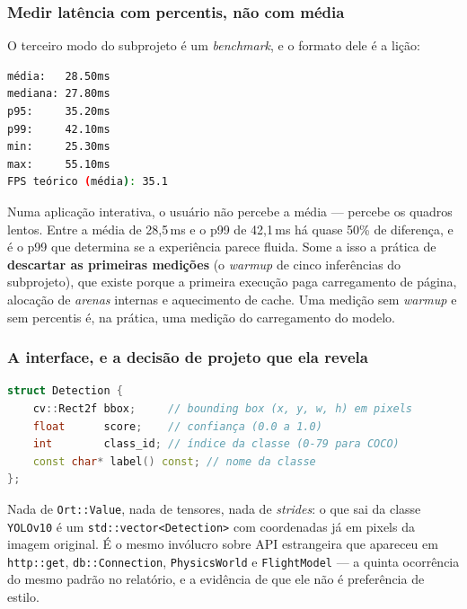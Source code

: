 \subsubsection{Medir latência com percentis, não com média}

O terceiro modo do subprojeto é um \emph{benchmark}, e o formato dele é a lição:

\begin{lstlisting}[style=bt, language=bash,
    caption={Saída de \texttt{src/yolo/}: \emph{benchmark} do \texttt{yolov10n} em CPU.}]
média:   28.50ms
mediana: 27.80ms
p95:     35.20ms
p99:     42.10ms
min:     25.30ms
max:     55.10ms
FPS teórico (média): 35.1
\end{lstlisting}

\begin{regra}
Numa aplicação interativa, o usuário não percebe a média --- percebe os quadros
lentos. Entre a média de 28,5\,ms e o p99 de 42,1\,ms há quase 50\% de
diferença, e é o p99 que determina se a experiência parece fluida. Some a isso a
prática de \textbf{descartar as primeiras medições} (o \emph{warmup} de cinco
inferências do subprojeto), que existe porque a primeira execução paga
carregamento de página, alocação de \emph{arenas} internas e aquecimento de
cache. Uma medição sem \emph{warmup} e sem percentis é, na prática, uma medição
do carregamento do modelo.
\end{regra}

\subsubsection{A interface, e a decisão de projeto que ela revela}

\begin{lstlisting}[style=bt, language=C++,
    caption={O tipo de domínio que atravessa a fronteira.}]
struct Detection {
    cv::Rect2f bbox;     // bounding box (x, y, w, h) em pixels
    float      score;    // confiança (0.0 a 1.0)
    int        class_id; // índice da classe (0-79 para COCO)
    const char* label() const; // nome da classe
};
\end{lstlisting}

Nada de \texttt{Ort::Value}, nada de tensores, nada de \emph{strides}: o que sai
da classe \texttt{YOLOv10} é um \texttt{std::vector<Detection>} com coordenadas
já em pixels da imagem original. É o mesmo invólucro sobre API estrangeira que
apareceu em \texttt{http::get}, \texttt{db::Connection},
\texttt{PhysicsWorld} e \texttt{FlightModel} --- a quinta ocorrência do mesmo
padrão no relatório, e a evidência de que ele não é preferência de estilo.

